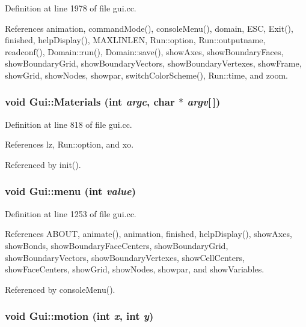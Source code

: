 Definition at line 1978 of file gui.cc.

References animation, commandMode(), consoleMenu(), domain, ESC, Exit(), finished, helpDisplay(), MAXLINLEN, Run::option, Run::outputname, readconf(), Domain::run(), Domain::save(), showAxes, showBoundaryFaces, showBoundaryGrid, showBoundaryVectors, showBoundaryVertexes, showFrame, showGrid, showNodes, showpar, switchColorScheme(), Run::time, and zoom.\hypertarget{namespaceGui_14bb49f023f388f7b0ff25c7a9b963e2}{
\subsubsection[{Materials}]{\setlength{\rightskip}{0pt plus 5cm}void Gui::Materials (int {\em argc}, \/  char $\ast$ {\em argv}\mbox{[}$\,$\mbox{]})}}
\label{namespaceGui_14bb49f023f388f7b0ff25c7a9b963e2}




Definition at line 818 of file gui.cc.

References lz, Run::option, and xo.

Referenced by init().\hypertarget{namespaceGui_b76fb09eeb57cd517ef9161f1d69b9a5}{
\subsubsection[{menu}]{\setlength{\rightskip}{0pt plus 5cm}void Gui::menu (int {\em value})}}
\label{namespaceGui_b76fb09eeb57cd517ef9161f1d69b9a5}




Definition at line 1253 of file gui.cc.

References ABOUT, animate(), animation, finished, helpDisplay(), showAxes, showBonds, showBoundaryFaceCenters, showBoundaryGrid, showBoundaryVectors, showBoundaryVertexes, showCellCenters, showFaceCenters, showGrid, showNodes, showpar, and showVariables.

Referenced by consoleMenu().\hypertarget{namespaceGui_c6941f396ae4c5f4a14ed6f39820bd93}{
\subsubsection[{motion}]{\setlength{\rightskip}{0pt plus 5cm}void Gui::motion (int {\em x}, \/  int {\em y})}}
\label{namespaceGui_c6941f396ae4c5f4a14ed6f39820bd93}




